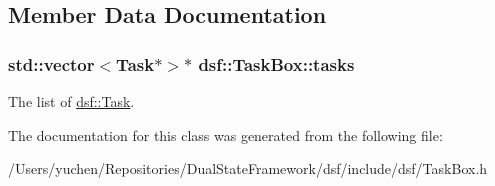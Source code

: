 \subsection{Member Data Documentation}
\hypertarget{classdsf_1_1_task_box_ae13d0d245cacbf7f4019f7ff5486aa79}{}
\subsubsection[{tasks}]{\setlength{\rightskip}{0pt plus 5cm}std\+::vector$<${\bf Task}$\ast$$>$$\ast$ dsf\+::\+Task\+Box\+::tasks\hspace{0.3cm}{\ttfamily [protected]}}\label{classdsf_1_1_task_box_ae13d0d245cacbf7f4019f7ff5486aa79}
The list of \hyperlink{classdsf_1_1_task}{dsf\+::\+Task}. 

The documentation for this class was generated from the following file\+:\begin{DoxyCompactItemize}
\item 
/\+Users/yuchen/\+Repositories/\+Dual\+State\+Framework/dsf/include/dsf/Task\+Box.\+h\end{DoxyCompactItemize}
